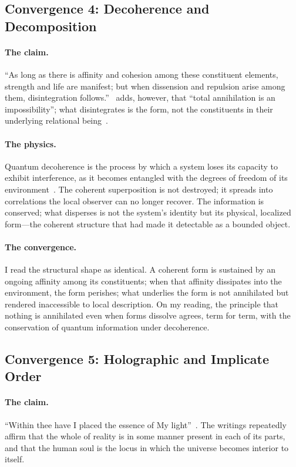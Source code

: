 \subsection{Convergence 4: Decoherence and Decomposition}

\paragraph{The \bahai claim.}
``As long as there is affinity and cohesion among these constituent
elements, strength and life are manifest; but when dissension and
repulsion arise among them, disintegration follows.''~\citep[Talk 41]{PUP}
\AbdulBaha adds, however, that ``total annihilation is an impossibility'';
what disintegrates is the form, not the constituents in their underlying
relational being~\citep[Talk 38]{PUP}.

\paragraph{The physics.}
Quantum decoherence is the process by which a system loses its capacity to
exhibit interference, as it becomes entangled with the degrees of freedom of
its environment~\citep{Zurek2003}.
The coherent superposition is not destroyed; it spreads into correlations the
local observer can no longer recover.
The information is conserved; what disperses is not the system's identity but its physical, localized form---the coherent structure that had made it detectable as a bounded object.

\paragraph{The convergence.}
I read the structural shape as identical.
A coherent form is sustained by an ongoing affinity among its constituents;
when that affinity dissipates into the environment, the form perishes; what
underlies the form is not annihilated but rendered inaccessible to local
description.
On my reading, the \bahai principle that nothing is annihilated even when forms dissolve
agrees, term for term, with the conservation of quantum information under
decoherence.

\subsection{Convergence 5: Holographic and Implicate Order}

\paragraph{The \bahai claim.}
``Within thee have I placed the essence of My light''~\citep[Arabic 12]{HiddenWords}.
The \bahai writings repeatedly affirm that the whole of reality is in some
manner present in each of its parts, and that the human soul is the locus in
which the universe becomes interior to itself.

